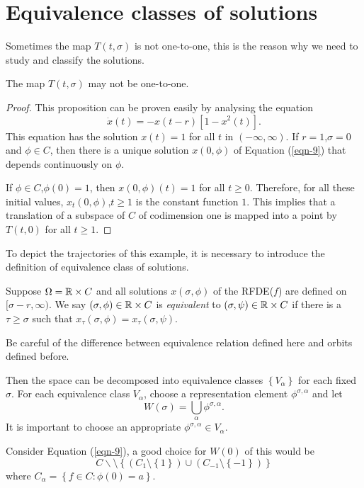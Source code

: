 \section{Equivalence classes of solutions}
Sometimes the map $T(t,\sigma)$ is not one-to-one, this is the reason why we need to study and classify the solutions.
\begin{proposition}
  The map $T(t,\sigma)$ may not be one-to-one.
\end{proposition}
\begin{proof}
This proposition can be proven easily by analysing the equation
\begin{equation}\label{eqn-9}
  \dot{x}(t)=-x(t-r)[1-x^2(t)].
\end{equation}
This equation has the solution $x(t)=1$ for all $t$ in $(-\infty,\infty)$. 
If $r=1$,$\sigma=0$ and $\phi \in C$, then there is a unique solution $x(0,\phi) $ of Equation (\ref{eqn-9}) that depends continuously on $\phi$.
  
If $\phi \in C$,$\phi(0)=1$, then $x(0,\phi)(t)=1$ for all $t\ge 0$. Therefore, for all these initial values, $x_t(0,\phi)$,$t\ge 1$ is the constant function $1$. This implies that a translation of a subspace of $C$ of codimension one is mapped into a point by $T(t,0)$ for all $t\ge 1$.
\end{proof}
To depict the trajectories of this example, it is necessary to introduce the definition of equivalence class of solutions.
\begin{definition}
  Suppose $\Omega=\mathbb{R}\times C$ and all solutions $x(\sigma,\phi)$ of the RFDE($f$) are defined on $[\sigma-r,\infty)$. We say $(\sigma,\phi)\in \mathbb{R}\times C$ is \textit{equivalent} to $(\sigma,\psi)\in \mathbb{R}\times C$ if there is a $\tau \ge \sigma$ such that $x_{\tau }(\sigma,\phi)=x_{\tau }(\sigma,\psi)$.
\end{definition}

Be careful of the difference between equivalence relation defined here and orbits defined before.

Then the space can be decomposed into equivalence classes $\left\{V_\alpha\right\} $ for each fixed $\sigma$. For each equivalence class $V_\alpha$, choose a representation element $\phi^{\sigma,\alpha}$ and let 
\begin{equation}
  W(\sigma)= \bigcup_{\alpha} \phi^{\sigma,\alpha}.
\end{equation}
It is important to choose an appropriate $\phi^{\sigma,\alpha}\in  V_\alpha$.
\begin{example}
  Consider Equation (\ref{eqn-9}), a good choice for $W(0)$ of this would be 
   \[
     C\backslash \setminus \left\{\left( C_1 \setminus \left\{1\right\}  \right)\cup \left( C_{-1}\setminus \left\{-1\right\}  \right)  \right\} 
  \] 
  where $C_\alpha=\left\{f\in C:\phi(0)=a\right\} $.
\end{example}

